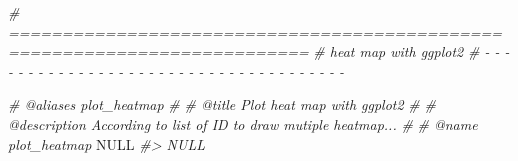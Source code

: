 \documentclass[
]{article}
\newenvironment{Shaded}{\begin{snugshade}}{\end{snugshade}}
\newcommand{\CommentTok}[1]{\textcolor[rgb]{0.56,0.35,0.01}{\textit{#1}}}
\newcommand{\ConstantTok}[1]{\textcolor[rgb]{0.00,0.00,0.00}{#1}}
\begin{document}
\begin{Shaded}
\begin{Highlighting}[]
\CommentTok{\# ==========================================================================}
\CommentTok{\# heat map with ggplot2}
\CommentTok{\# {-} {-} {-} {-} {-} {-} {-} {-} {-} {-} {-} {-} {-} {-} {-} {-} {-} {-} {-} {-} {-} {-} {-} {-} {-} {-} {-} {-} {-} {-} {-} {-} {-} {-} {-} {-} {-}}

\CommentTok{\#\textquotesingle{} @aliases plot\_heatmap}
\CommentTok{\#\textquotesingle{}}
\CommentTok{\#\textquotesingle{} @title Plot heat map with ggplot2}
\CommentTok{\#\textquotesingle{}}
\CommentTok{\#\textquotesingle{} @description According to list of \textquotesingle{}ID\textquotesingle{} to draw mutiple heatmap...}
\CommentTok{\#\textquotesingle{}}
\CommentTok{\#\textquotesingle{} @name plot\_heatmap}
\ConstantTok{NULL}
\CommentTok{\#\textgreater{} NULL}


\end{Highlighting}
\end{Shaded}
\end{document}
